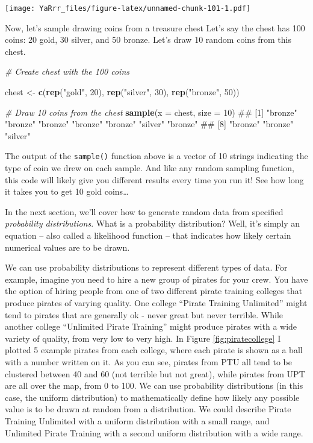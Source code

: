 \documentclass[]{book}
\newenvironment{Shaded}{\begin{snugshade}}{\end{snugshade}}
\newcommand{\KeywordTok}[1]{\textcolor[rgb]{0.13,0.29,0.53}{\textbf{#1}}}
\newcommand{\DataTypeTok}[1]{\textcolor[rgb]{0.13,0.29,0.53}{#1}}
\newcommand{\DecValTok}[1]{\textcolor[rgb]{0.00,0.00,0.81}{#1}}
\newcommand{\StringTok}[1]{\textcolor[rgb]{0.31,0.60,0.02}{#1}}
\newcommand{\CommentTok}[1]{\textcolor[rgb]{0.56,0.35,0.01}{\textit{#1}}}
\newcommand{\NormalTok}[1]{#1}
\theoremstyle{definition}
\theoremstyle{definition}
\theoremstyle{remark}
\begin{document}
\texttt{[image: YaRrr\_files/figure-latex/unnamed-chunk-101-1.pdf]}

Now, let's sample drawing coins from a treasure chest Let's say the
chest has 100 coins: 20 gold, 30 silver, and 50 bronze. Let's draw 10
random coins from this chest.

\begin{Shaded}
\begin{Highlighting}[]
\CommentTok{# Create chest with the 100 coins}

\NormalTok{chest <-}\StringTok{ }\KeywordTok{c}\NormalTok{(}\KeywordTok{rep}\NormalTok{(}\StringTok{"gold"}\NormalTok{, }\DecValTok{20}\NormalTok{),}
         \KeywordTok{rep}\NormalTok{(}\StringTok{"silver"}\NormalTok{, }\DecValTok{30}\NormalTok{),}
         \KeywordTok{rep}\NormalTok{(}\StringTok{"bronze"}\NormalTok{, }\DecValTok{50}\NormalTok{))}

\CommentTok{# Draw 10 coins from the chest}
\KeywordTok{sample}\NormalTok{(}\DataTypeTok{x =}\NormalTok{ chest,}
       \DataTypeTok{size =} \DecValTok{10}\NormalTok{)}
\NormalTok{##  [1] "bronze" "bronze" "bronze" "bronze" "bronze" "silver" "bronze"}
\NormalTok{##  [8] "bronze" "bronze" "silver"}
\end{Highlighting}
\end{Shaded}

The output of the \texttt{sample()} function above is a vector of 10
strings indicating the type of coin we drew on each sample. And like any
random sampling function, this code will likely give you different
results every time you run it! See how long it takes you to get 10 gold
coins\ldots{}

In the next section, we'll cover how to generate random data from
specified \emph{probability distributions}. What is a probability
distribution? Well, it's simply an equation -- also called a likelihood
function -- that indicates how likely certain numerical values are to be
drawn.

We can use probability distributions to represent different types of
data. For example, imagine you need to hire a new group of pirates for
your crew. You have the option of hiring people from one of two
different pirate training colleges that produce pirates of varying
quality. One college ``Pirate Training Unlimited'' might tend to pirates
that are generally ok - never great but never terrible. While another
college ``Unlimited Pirate Training'' might produce pirates with a wide
variety of quality, from very low to very high. In Figure
\ref{fig:piratecollege} I plotted 5 example pirates from each college,
where each pirate is shown as a ball with a number written on it. As you
can see, pirates from PTU all tend to be clustered between 40 and 60
(not terrible but not great), while pirates from UPT are all over the
map, from 0 to 100. We can use probability distributions (in this case,
the uniform distribution) to mathematically define how likely any
possible value is to be drawn at random from a distribution. We could
describe Pirate Training Unlimited with a uniform distribution with a
small range, and Unlimited Pirate Training with a second uniform
distribution with a wide range.
\end{document}
